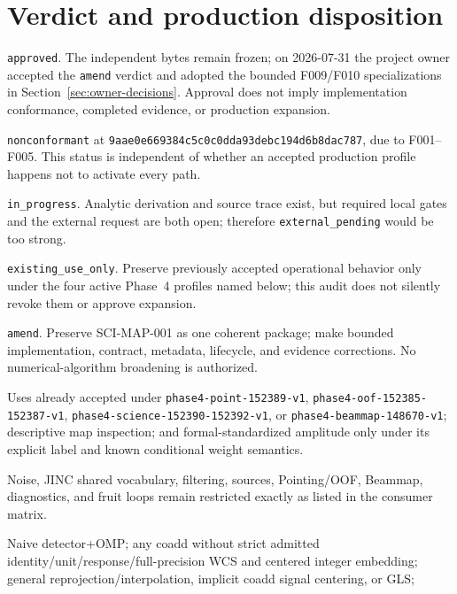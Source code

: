 \documentclass[11pt]{article}
\newcommand{\code}[1]{\nolinkurl{#1}}
\newcommand{\gitsha}[5]{\texttt{#1\allowbreak#2\allowbreak#3\allowbreak#4\allowbreak#5}}
\newcommand{\AuditPackageID}{SCI-MAP-001}
\newcommand{\AuditGoverningSHA}{\gitsha{9aae0e66}{9384c5c0}{c0dda93d}{ebc194d6}{b8dac787}}
\begin{document}
\section{Verdict and production disposition}

\begin{description}[style=nextline]
\item[Contract status] \texttt{approved}.  The independent bytes remain frozen;
on 2026-07-31 the project owner accepted the \texttt{amend} verdict and adopted
the bounded F009/F010 specializations in Section~\ref{sec:owner-decisions}.
Approval does not imply implementation conformance, completed evidence, or
production expansion.
\item[Implementation status] \texttt{nonconformant} at
\AuditGoverningSHA, due to F001--F005.  This status is independent of
whether an accepted production profile happens not to activate every path.
\item[Validation status] \code{in_progress}.  Analytic derivation and source
trace exist, but required local gates and the external request are both open;
therefore \code{external_pending} would be too strong.
\item[Production status] \code{existing_use_only}.  Preserve previously
accepted operational behavior only under the four active Phase~4 profiles named
below; this audit does not silently revoke them or approve expansion.
\item[Verdict] \texttt{amend}.  Preserve \AuditPackageID{} as one coherent
package; make bounded implementation, contract, metadata, lifecycle, and
evidence corrections.  No numerical-algorithm broadening is authorized.
\item[Allowed consumers] {\raggedright Uses already accepted under
\code{phase4-point-152389-v1}, \code{phase4-oof-152385-152387-v1},
\code{phase4-science-152390-152392-v1}, or
\code{phase4-beammap-148670-v1}; descriptive map inspection; and
formal-standardized amplitude only under its explicit label and known
conditional weight semantics.\par}
\item[Restricted consumers] Noise, JINC shared vocabulary, filtering, sources,
Pointing/OOF, Beammap, diagnostics, and fruit loops remain restricted exactly as
listed in the consumer matrix.
\item[Fail-closed uses] Naive detector+OMP; any coadd without strict admitted
identity/unit/response/full-precision WCS and centered integer embedding;
general reprojection/interpolation, implicit coadd signal centering, or GLS;

\end{description}
\end{document}
